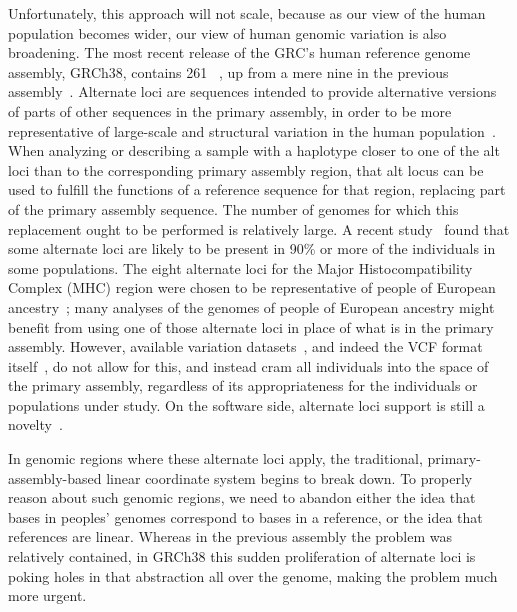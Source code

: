 Unfortunately, this approach will not scale, because as our view of the human population becomes wider, our view of human genomic variation is also broadening. The most recent release of the GRC's human reference genome assembly, GRCh38, contains 261 ~\cite{grc2013announcing}, up from a mere nine in the previous assembly~\cite{grc2009grch37}. Alternate loci are sequences intended to provide alternative versions of parts of other sequences in the primary assembly, in order to be more representative of large-scale and structural variation in the human population~\cite{karolchik2014new}. When analyzing or describing a sample with a haplotype closer to one of the alt loci than to the corresponding primary assembly region, that alt locus can be used to fulfill the functions of a reference sequence for that region, replacing part of the primary assembly sequence. The number of genomes for which this replacement ought to be performed is relatively large. A recent study~\cite{jager2016alternate} found that some alternate loci are likely to be present in 90\% or more of the individuals in some populations. The eight alternate loci for the Major Histocompatibility Complex (MHC) region were chosen to be representative of people of European ancestry~\cite{horton2008variation}; many analyses of the genomes of people of European ancestry might benefit from using one of those alternate loci in place of what is in the primary assembly. However, available variation datasets~\cite{10002015global}, and indeed the VCF format itself~\cite{danecek2011variant,marshall2013variant}, do not allow for this, and instead cram all individuals into the space of the primary assembly, regardless of its appropriateness for the individuals or populations under study. On the software side, alternate loci support is still a novelty~\cite{jager2016alternate}.


In genomic regions where these alternate loci apply, the traditional, primary-assembly-based linear coordinate system begins to break down. To properly reason about such genomic regions, we need to abandon either the idea that bases in peoples' genomes correspond to bases in a reference, or the idea that references are linear. Whereas in the previous assembly the problem was relatively contained, in GRCh38 this sudden proliferation of alternate loci is poking holes in that abstraction all over the genome, making the problem much more urgent.

